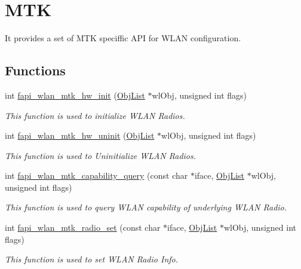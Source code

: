 \hypertarget{group__FAPI__WLAN__MTK}{\section{M\-T\-K}
\label{group__FAPI__WLAN__MTK}
}


It provides a set of M\-T\-K speciffic A\-P\-I for W\-L\-A\-N configuration.  


\subsection*{Functions}
\begin{DoxyCompactItemize}
\item 
int \hyperlink{group__FAPI__WLAN__MTK_ga855acd474011bfafa43fcd60f19677f7}{fapi\-\_\-wlan\-\_\-mtk\-\_\-hw\-\_\-init} (\hyperlink{structObjList}{Obj\-List} $\ast$wl\-Obj, unsigned int flags)
\begin{DoxyCompactList}\small\item\em This function is used to initialize W\-L\-A\-N Radios. \end{DoxyCompactList}\item 
int \hyperlink{group__FAPI__WLAN__MTK_ga2263cdf663761a72e9ef34b0737fed5a}{fapi\-\_\-wlan\-\_\-mtk\-\_\-hw\-\_\-uninit} (\hyperlink{structObjList}{Obj\-List} $\ast$wl\-Obj, unsigned int flags)
\begin{DoxyCompactList}\small\item\em This function is used to Uninitialize W\-L\-A\-N Radios. \end{DoxyCompactList}\item 
int \hyperlink{group__FAPI__WLAN__MTK_ga072e397577e8156a5d657f5ba0f188ef}{fapi\-\_\-wlan\-\_\-mtk\-\_\-capability\-\_\-query} (const char $\ast$iface, \hyperlink{structObjList}{Obj\-List} $\ast$wl\-Obj, unsigned int flags)
\begin{DoxyCompactList}\small\item\em This function is used to query W\-L\-A\-N capability of underlying W\-L\-A\-N Radio. \end{DoxyCompactList}\item 
int \hyperlink{group__FAPI__WLAN__MTK_gaa410cf97e2163b3db5bbc0e26b601ed0}{fapi\-\_\-wlan\-\_\-mtk\-\_\-radio\-\_\-set} (const char $\ast$iface, \hyperlink{structObjList}{Obj\-List} $\ast$wl\-Obj, unsigned int flags)
\begin{DoxyCompactList}\small\item\em This function is used to set W\-L\-A\-N Radio Info. \end{DoxyCompactList}\item 

\end{DoxyCompactItemize}
